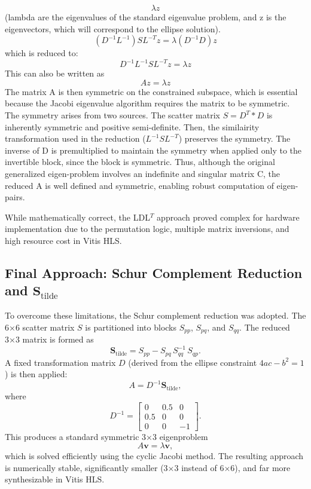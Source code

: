 \documentclass[11pt,a4paper]{article}
\begin{document}
\begin{equation}
    \lambda z
\end{equation}
(lambda are the eigenvalues of the standard eigenvalue problem, and z is the eigenvectors, which will correspond to the ellipse solution). 
\begin{equation}
    (D^{-1}L^{-1})SL^{-T}z = \lambda (D^{-1}D)z 
\end{equation}
which is reduced to: 
\begin{equation}
    D^{-1}L^{-1}SL^{-T}z = \lambda z
\end{equation}
This can also be written as
\begin{equation}
    Az = \lambda z
\end{equation}
The matrix A is then symmetric on the constrained subspace, which is essential because the Jacobi eigenvalue algorithm requires the matrix to be symmetric. The symmetry arises from two sources. The scatter matrix $S = D^{T} * D$ is inherently symmetric and positive semi-definite. Then, the similairity transformation used in the reduction ($L^{-1} S L^{-T}$) preserves the symmetry. The inverse of D is premultiplied to maintain the symmetry when applied only to the invertible block, since the block is symmetric. Thus, although the original generalized eigen-problem involves an indefinite and singular matrix C, the reduced A is well defined and symmetric, enabling robust computation of eigen-pairs. 

While mathematically correct, the LDL$^T$ approach proved complex for hardware implementation due to the permutation logic, multiple matrix inversions, and high resource cost in Vitis HLS.

\subsection{Final Approach: Schur Complement Reduction and \(\mathbf{S}_{\text{tilde}}\)}

To overcome these limitations, the Schur complement reduction was adopted. The 6×6 scatter matrix \(S\) is partitioned into blocks \(S_{pp}\), \(S_{pq}\), and \(S_{qq}\). The reduced 3×3 matrix is formed as
\[
\mathbf{S}_{\text{tilde}} = S_{pp} - S_{pq}\, S_{qq}^{-1}\, S_{qp}.
\]
A fixed transformation matrix \(D\) (derived from the ellipse constraint \(4ac - b^2 = 1\)) is then applied:
\[
A = D^{-1} \mathbf{S}_{\text{tilde}},
\]
where
\[
D^{-1} = \begin{bmatrix}
0 & 0.5 & 0 \\
0.5 & 0 & 0 \\
0 & 0 & -1
\end{bmatrix}.
\]
This produces a standard symmetric 3×3 eigenproblem
\[
A\mathbf{v} = \lambda \mathbf{v},
\]
which is solved efficiently using the cyclic Jacobi method. The resulting approach is numerically stable, significantly smaller (3×3 instead of 6×6), and far more synthesizable in Vitis HLS.
\end{document}
